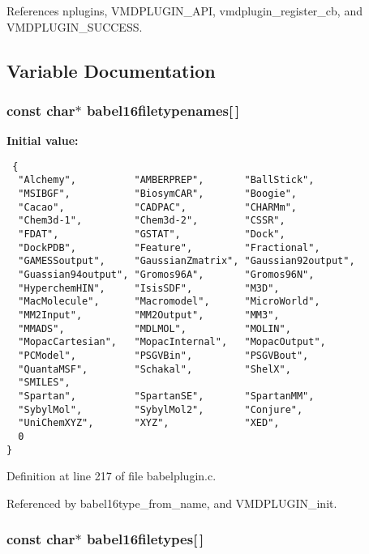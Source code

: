References nplugins, VMDPLUGIN\_\-API, vmdplugin\_\-register\_\-cb, and VMDPLUGIN\_\-SUCCESS.

\subsection{Variable Documentation}
\subsubsection{\setlength{\rightskip}{0pt plus 5cm}const char$\ast$ babel16filetypenames[$\,$]\hspace{0.3cm}{\tt  [static]}}\label{babelplugin_8c_a2}


{\bf Initial value:}

\footnotesize\begin{verbatim} {
  "Alchemy",          "AMBERPREP",       "BallStick",      
  "MSIBGF",           "BiosymCAR",       "Boogie",
  "Cacao",            "CADPAC",          "CHARMm",
  "Chem3d-1",         "Chem3d-2",        "CSSR",
  "FDAT",             "GSTAT",           "Dock",
  "DockPDB",          "Feature",         "Fractional",    
  "GAMESSoutput",     "GaussianZmatrix", "Gaussian92output", 
  "Guassian94output", "Gromos96A",       "Gromos96N",
  "HyperchemHIN",     "IsisSDF",         "M3D",
  "MacMolecule",      "Macromodel",      "MicroWorld",
  "MM2Input",         "MM2Output",       "MM3",
  "MMADS",            "MDLMOL",          "MOLIN",
  "MopacCartesian",   "MopacInternal",   "MopacOutput",
  "PCModel",          "PSGVBin",         "PSGVBout",
  "QuantaMSF",        "Schakal",         "ShelX",
  "SMILES",
  "Spartan",          "SpartanSE",       "SpartanMM",
  "SybylMol",         "SybylMol2",       "Conjure",
  "UniChemXYZ",       "XYZ",             "XED", 
  0
}\end{verbatim}\normalsize 


Definition at line 217 of file babelplugin.c.

Referenced by babel16type\_\-from\_\-name, and VMDPLUGIN\_\-init.
\subsubsection{\setlength{\rightskip}{0pt plus 5cm}const char$\ast$ babel16filetypes[$\,$]\hspace{0.3cm}{\tt  [static]}}\label{babelplugin_8c_a1}




